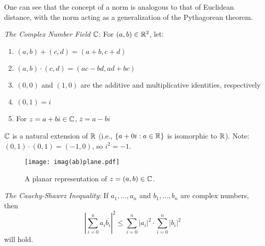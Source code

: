 One can see that the concept of a norm is analogous to that of Euclidean distance, with the norm acting as a generalization of the Pythagorean theorem.

\begin{definition}
    \emph{The Complex Number Field $\mathbb{C}$}: For $(a,b)\in \mathbb{R}^2$, let: \begin{enumerate}
        \item $(a,b)+(c,d) = (a+b ,  c+d)$
        \item $(a,b)\cdot (c,d) = (ac-bd,ad+bc)$
        \item $(0,0)$ and $(1,0)$ are the additive and multiplicative identities, respectively
        \item $(0,1)=i$
        \item For $z=a+bi\in \mathbb{C}$, $\overline{z}=a-bi$
        \end{enumerate}
\end{definition}

$\mathbb{C}$ is a natural extension of $\mathbb{R}$ (i.e., $\{a+0i:a\in \mathbb{R}\}$ is isomorphic to $\mathbb{R}$). Note: $(0,1)\cdot(0,1)=(-1,0)$, so $i^2 = -1$.

\begin{figure}[H]
        \centering
        \texttt{[image: imag(ab)plane.pdf]}
        \caption{A planar representation of $z=(a,b)\in \mathbb{C}$.}
        \label{fig:enter-label}
    \end{figure}

\begin{theorem}
	\emph{The Cauchy-Shawrz Inequality}: If $a_1,...,a_n$ and $b_1,...,b_n$ are complex numbers, then $$\left|\sum^n_{i=0} a_i\overline{b_i}\right|^2 \leq \sum^n_{i=0}|a_i|^2 \cdot \sum^n_{i=0}|b_i|^2$$ will hold.
\end{theorem}